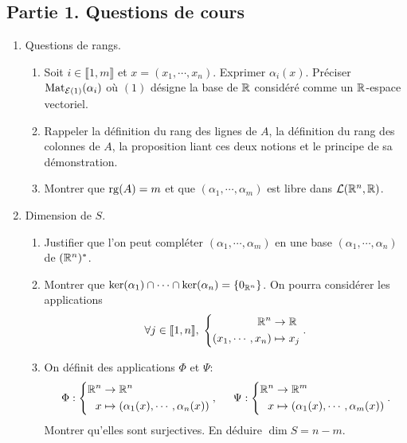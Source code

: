 \subsection*{Partie 1. Questions de cours}
\begin{enumerate}
  \item Questions de rangs.
  \begin{enumerate}
    \item Soit $i \in \llbracket 1,m \rrbracket$ et $x=(x_1, \cdots, x_n)$. Exprimer $\alpha_i(x)$. Préciser $\operatorname{Mat}_{\mathcal{E} (1)}(\alpha_i)$ où $(1)$ désigne la base de $\mathbb{R}$ considéré comme un $\mathbb{R}$-espace vectoriel.
    \item Rappeler la définition du rang des lignes de $A$, la définition du rang des colonnes de $A$, la proposition liant ces deux notions et le principe de sa démonstration. 
    \item Montrer que $\operatorname{rg}(A) = m$ et que $(\alpha_1,\cdots, \alpha_m)$ est libre dans $\mathcal{L}(\mathbb{R}^n,\mathbb{R})$.
  \end{enumerate}
  \item Dimension de $S$.
  \begin{enumerate}
    \item Justifier que l'on peut compléter $(\alpha_1, \cdots, \alpha_m)$ en une base $(\alpha_1, \cdots, \alpha_n)$ de $(\mathbb{R}^n)^*$.
    \item Montrer que $\ker(\alpha_1) \cap \cdots \cap \ker(\alpha_n) = \left\lbrace 0_{\mathbb{R}^n} \right\rbrace$. On pourra considérer les applications
\[
  \forall j \in \llbracket 1,n \rrbracket, \;
  \left\lbrace
  \begin{aligned}
    \mathbb{R}^n &\rightarrow \mathbb{R} \\ 
    (x_1, \cdots, x_n) &\mapsto x_j
  \end{aligned} \right. .
\]
   \item On définit des applications $\Phi$ et $\Psi$:
\[
  \Phi :
  \left\lbrace
  \begin{aligned}
    \mathbb{R}^n &\rightarrow \mathbb{R}^n \\
    x &\mapsto (\alpha_1(x), \cdots, \alpha_n(x))
  \end{aligned}
   \right., \hspace{0.5cm}
     \Psi :
  \left\lbrace
  \begin{aligned}
    \mathbb{R}^n &\rightarrow \mathbb{R}^m \\
    x &\mapsto (\alpha_1(x), \cdots, \alpha_m(x))
  \end{aligned}
   \right. .
\]
Montrer qu'elles sont surjectives. En déduire $\dim S = n -m$.
  \end{enumerate}


\end{enumerate}
